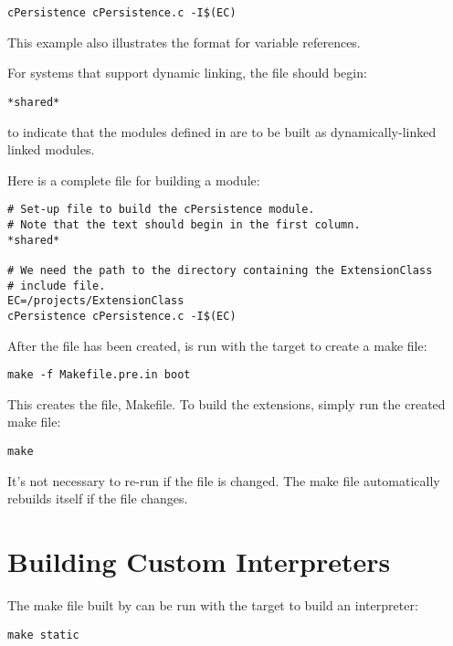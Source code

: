 \documentclass{manual}
\begin{document}
\begin{verbatim}
cPersistence cPersistence.c -I$(EC)
\end{verbatim}

This example also illustrates the format for variable references.

For systems that support dynamic linking, the  file should 
begin:

\begin{verbatim}
*shared*
\end{verbatim}

to indicate that the modules defined in  are to be built
as dynamically-linked linked modules.

Here is a complete  file for building a
 module:

\begin{verbatim}
# Set-up file to build the cPersistence module. 
# Note that the text should begin in the first column.
*shared*

# We need the path to the directory containing the ExtensionClass
# include file.
EC=/projects/ExtensionClass
cPersistence cPersistence.c -I$(EC)
\end{verbatim}

After the  file has been created, 
is run with the  target to create a make file:

\begin{verbatim}
make -f Makefile.pre.in boot
\end{verbatim}

This creates the file, Makefile.  To build the extensions, simply
run the created make file:

\begin{verbatim}
make
\end{verbatim}

It's not necessary to re-run  if the
 file is changed.  The make file automatically rebuilds
itself if the  file changes.

\section{Building Custom Interpreters}

The make file built by  can be run with the
 target to build an interpreter:

\begin{verbatim}
make static
\end{verbatim}
\end{document}
